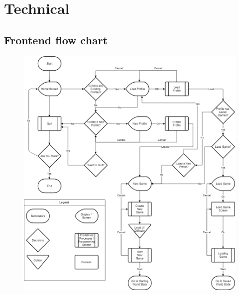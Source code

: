 \section{Technical}
    \subsection{Frontend flow chart}
        \begin{figure}[H]
            \centering
            \includegraphics[width=\linewidth]{images/frontflow}
        \end{figure}
